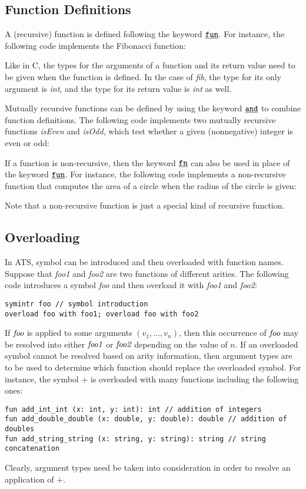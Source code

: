 \subsection{Function Definitions}

A (recursive) function is defined following the keyword $\underline{\texttt{fun}}$.
For instance, the following code implements the Fibonacci function:

Like in C, the types for the arguments of a function and its return value
need to be given when the function is defined. In the case of {\it fib},
the type for its only argument is {\it\blue int}, and the type for its
return value is {\it\blue int} as well.

Mutually recursive functions can be defined by using the keyword $\underline{\texttt{and}}$
to combine function definitions. The following code implements two mutually
recursive functions {\it isEven} and {\it isOdd}, which test whether a given
(nonnegative) integer is even or odd:


If a function is non-recursive, then the keyword $\underline{\texttt{fn}}$ can also be used
in place of the keyword $\underline{\texttt{fun}}$. For instance, the following code
implements a non-recursive function that computes the area of a circle when
the radius of the circle is given:

Note that a non-recursive function is just a special kind of recursive
function.

\subsection{Overloading}
In ATS, symbol can be introduced and then overloaded with function names.
Suppose that {\it foo1} and {\it foo2} are two functions of different
arities. The following code introduces a symbol {\it foo} and then overload
it with {\it foo1} and {\it foo2}:
\begin{verbatim}
symintr foo // symbol introduction
overload foo with foo1; overload foo with foo2
\end{verbatim}
If $\mbox{\it foo}$ is applied to some arguments $(v_1,\ldots,v_n)$, then
this occurrence of $\mbox{\it foo}$ may be resolved into either $\mbox{\it
foo1}$ or $\mbox{\it foo2}$ depending on the value of $n$.  If an
overloaded symbol cannot be resolved based on arity information, then
argument types are to be used to determine which function should replace
the overloaded symbol.  For instance, the symbol $+$ is overloaded with
many functions including the following ones:
\begin{verbatim}
fun add_int_int (x: int, y: int): int // addition of integers
fun add_double_double (x: double, y: double): double // addition of doubles
fun add_string_string (x: string, y: string): string // string concatenation
\end{verbatim}
Clearly, argument types need be taken into consideration in order to
resolve an application of $+$.

